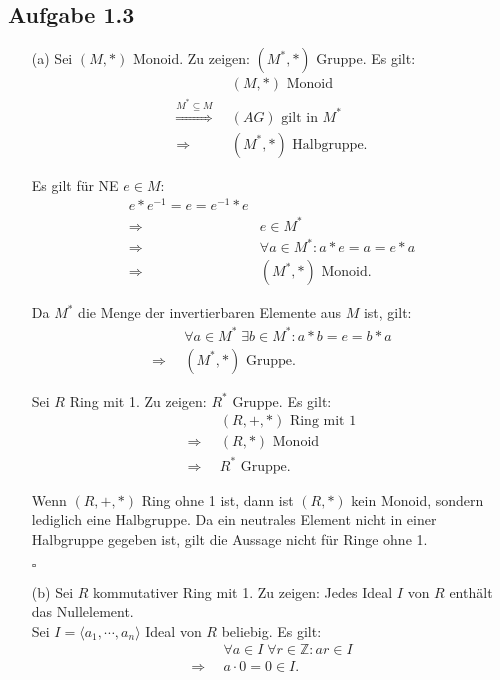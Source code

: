 \documentclass[12pt]{article}
\newcommand{\QED}{\begin{flushright} $\square$ \end{flushright}}
\newcommand{\df}{\Longrightarrow \enspace}
\begin{document}
\subsection*{Aufgabe 1.3}
\begin{enumerate}
\item[(a)]
Sei $(M,*)$ Monoid. Zu zeigen: $(M^*,*)$ Gruppe. Es gilt:
\begin{align*}
	&(M,*) \text{ Monoid} \\
	\overset{M^* \subseteq M}{\Longrightarrow} \enspace &(AG) \text{ gilt in } M^* \\
	\df &(M^*,*) \text{ Halbgruppe.}
\end{align*}

Es gilt für NE $e \in M$:
\begin{align*}
	e*e^{-1} = e = e^{-1}*e \\
	\df &e \in M^* \\
	\df &\forall a \in M^*: a*e = a = e*a \\
	\df &(M^*,*) \text{ Monoid.}
\end{align*}

Da $M^*$ die Menge der invertierbaren Elemente aus $M$ ist, gilt:
\begin{align*}
	&\forall a \in M^* \; \exists b \in M^*: a*b = e = b*a \\
	\df &(M^*,*) \text{ Gruppe.}
\end{align*}

Sei $R$ Ring mit 1. Zu zeigen: $R^*$ Gruppe. Es gilt:
\begin{align*}
	&(R,+,*) \text{ Ring mit 1} \\
	\df &(R,*) \text{ Monoid} \\
	\df &R^* \text{ Gruppe.}
\end{align*}

Wenn $(R,+,*)$ Ring ohne 1 ist, dann ist $(R,*)$ kein Monoid, sondern lediglich eine Halbgruppe.
Da ein neutrales Element nicht in einer Halbgruppe gegeben ist, gilt die Aussage nicht für Ringe ohne 1.
\QED

\item[(b)]
Sei $R$ kommutativer Ring mit 1. Zu zeigen: Jedes Ideal $I$ von $R$ enthält das Nullelement. \\
Sei $I = \langle a_1, \cdots, a_n \rangle$ Ideal von $R$ beliebig. Es gilt:
\begin{align*}
	&\forall a \in I \; \forall r \in \mathbb{Z}: a r \in I \\
	\df &a \cdot 0 = 0 \in I.
\end{align*}
	

\end{enumerate}
\end{document}
